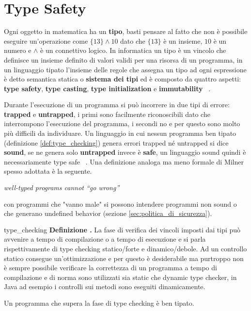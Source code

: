 \documentclass[Lau,binding=0.6cm]{sapthesis}
\newenvironment{myDefinition}[2]{ \begin{Definizione}[adjusted title=#1]{}{#2}
    \textbf{Definizione \thetcbcounter.} }{\end{Definizione}}
\begin{document}



\clearpage
\chapter{Type Safety} \label{chap:type_safety}
Ogni oggetto in matematica ha un \textbf{tipo}, basti pensare al fatto che non è possibile eseguire un'operazione come $ \{13\} \land 10 $ dato che $\{13\}$ è un insieme, $10$ è un numero e $\land$ è un connettivo logico. 
In informatica un tipo è un vincolo che definisce un insieme definito di valori validi per una risorsa di un programma, in un linguaggio tipato l'insieme delle regole che assegna un tipo ad ogni espressione è detto semantica statica o \textbf{sistema dei tipi} ed è composto da quattro aspetti: \textbf{type safety}, \textbf{type casting}, \textbf{type initialization} e \textbf{immutability} ~\cite{security_framework}.

Durante l'esecuzione di un programma si può incorrere in due tipi di errore: \textbf{trapped} e \textbf{untrapped}, i primi sono facilmente riconoscibili dato che interrompono l'esecuzione del programma, i secondi no e per questo sono molto più difficili da individuare. Un linguaggio in cui nessun programma ben tipato (definizione \ref{def:type_checking}) genera errori trapped né untrapped si dice \textbf{sound}, se ne genera solo \textbf{untrapped} invece è \textbf{safe}, un linguaggio sound quindi è necessariamente type safe ~\cite{cencia:dispense}. Una definizione analoga ma meno formale di Milner spesso adottata è la seguente. 

\begin{center}
   \textit{well-typed programs cannot “go wrong”} ~\cite{milner:type_polymorphism}
\end{center}

con programmi che "vanno male" si possono intendere programmi non sound o che generano undefined behavior (sezione \ref{sec:politica_di_sicurezza}).

\begin{myDefinition}{Type checking}{type_checking}
    La fase di verifica dei vincoli imposti dai tipi può avvenire a tempo di compilazione o a tempo di esecuzione e si parla rispettivamente di type checking statico/forte e dinamico/debole. Ad un controllo statico consegue un'ottimizzazione e per questo è desiderabile ma purtroppo non è sempre possibile verificare la correttezza di un programma a tempo di compilazione e di norma sono utilizzati sia static che dynamic type checker, in Java ad esempio i controlli sui metodi sono eseguiti dinamicamente.

    Un programma che supera la fase di type checking è ben tipato.     
\end{myDefinition}
 
\end{document}
